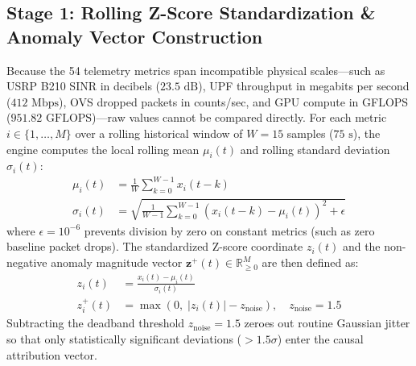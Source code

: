 \subsection{Stage 1: Rolling Z-Score Standardization \& Anomaly Vector Construction}
Because the 54 telemetry metrics span incompatible physical scales---such as USRP B210 SINR in decibels ($23.5\text{ dB}$), UPF throughput in megabits per second ($412\text{ Mbps}$), OVS dropped packets in counts/sec, and GPU compute in GFLOPS ($951.82\text{ GFLOPS}$)---raw values cannot be compared directly. For each metric $i \in \{1, \dots, M\}$ over a rolling historical window of $W = 15$ samples ($75\text{ s}$), the engine computes the local rolling mean $\mu_i(t)$ and rolling standard deviation $\sigma_i(t)$:
\begin{align}
\mu_i(t) &= \frac{1}{W} \sum_{k=0}^{W-1} x_i(t - k) \label{eq:z_mean} \\
\sigma_i(t) &= \sqrt{ \frac{1}{W - 1} \sum_{k=0}^{W-1} \left( x_i(t - k) - \mu_i(t) \right)^2 + \epsilon } \label{eq:z_std}
\end{align}
where $\epsilon = 10^{-6}$ prevents division by zero on constant metrics (such as zero baseline packet drops). The standardized Z-score coordinate $z_i(t)$ and the non-negative anomaly magnitude vector $\mathbf{z}^+(t) \in \mathbb{R}_{\ge 0}^M$ are then defined as:
\begin{align}
z_i(t) &= \frac{x_i(t) - \mu_i(t)}{\sigma_i(t)} \label{eq:z_score} \\
z_i^+(t) &= \max\left( 0, \; |z_i(t)| - z_{\text{noise}} \right), \quad z_{\text{noise}} = 1.5 \label{eq:z_pos}
\end{align}
Subtracting the deadband threshold $z_{\text{noise}} = 1.5$ zeroes out routine Gaussian jitter so that only statistically significant deviations ($>1.5\sigma$) enter the causal attribution vector.

